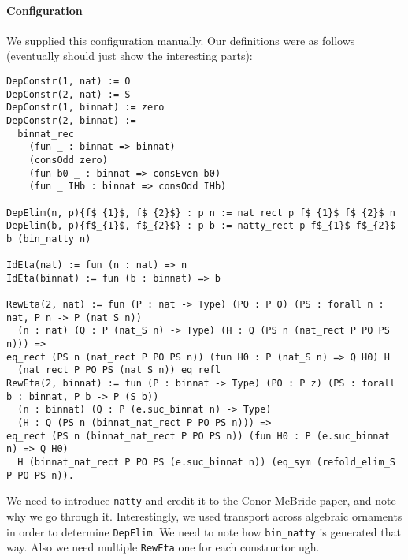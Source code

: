 \paragraph{Configuration}
We supplied this configuration manually.
Our definitions were as follows (eventually should just show the interesting parts):

\begin{lstlisting}
DepConstr(1, nat) := O 
DepConstr(2, nat) := S
DepConstr(1, binnat) := zero
DepConstr(2, binnat) :=
  binnat_rec
    (fun _ : binnat => binnat)
    (consOdd zero)
    (fun b0 _ : binnat => consEven b0)
    (fun _ IHb : binnat => consOdd IHb)

DepElim(n, p){f$_{1}$, f$_{2}$} : p n := nat_rect p f$_{1}$ f$_{2}$ n
DepElim(b, p){f$_{1}$, f$_{2}$} : p b := natty_rect p f$_{1}$ f$_{2}$ b (bin_natty n)

IdEta(nat) := fun (n : nat) => n
IdEta(binnat) := fun (b : binnat) => b

RewEta(2, nat) := fun (P : nat -> Type) (PO : P O) (PS : forall n : nat, P n -> P (nat_S n))
  (n : nat) (Q : P (nat_S n) -> Type) (H : Q (PS n (nat_rect P PO PS n))) =>
eq_rect (PS n (nat_rect P PO PS n)) (fun H0 : P (nat_S n) => Q H0) H
  (nat_rect P PO PS (nat_S n)) eq_refl
RewEta(2, binnat) := fun (P : binnat -> Type) (PO : P z) (PS : forall b : binnat, P b -> P (S b))
  (n : binnat) (Q : P (e.suc_binnat n) -> Type)
  (H : Q (PS n (binnat_nat_rect P PO PS n))) =>
eq_rect (PS n (binnat_nat_rect P PO PS n)) (fun H0 : P (e.suc_binnat n) => Q H0)
  H (binnat_nat_rect P PO PS (e.suc_binnat n)) (eq_sym (refold_elim_S P PO PS n)).
\end{lstlisting}
We need to introduce \lstinline{natty} and credit it to the Conor McBride paper,
and note why we go through it.
Interestingly, we used transport across algebraic ornaments in order to determine
\lstinline{DepElim}.
We need to note how \lstinline{bin_natty} is generated that way.
Also we need multiple \lstinline{RewEta} one for each constructor ugh.




